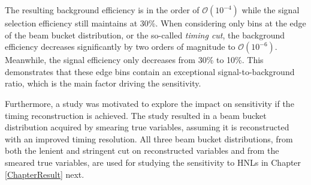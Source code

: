 The resulting background efficiency is in the order of $\mathcal{O}(10^{-4})$ while the signal selection efficiency still maintains at 30\%. 
When considering only bins at the edge of the beam bucket distribution, or the so-called \textit{timing cut}, the background efficiency decreases significantly by two orders of magnitude to $\mathcal{O}(10^{-6})$.
Meanwhile, the signal efficiency only decreases from 30\% to 10\%. 
This demonstrates that these edge bins contain an exceptional signal-to-background ratio, which is the main factor driving the sensitivity.

Furthermore, a study was motivated to explore the impact on sensitivity if the timing reconstruction is achieved.
The study resulted in a beam bucket distribution acquired by smearing true variables, assuming it is reconstructed with an improved timing resolution.
All three beam bucket distributions, from both the lenient and stringent cut on reconstructed variables and from the smeared true variables, are used for studying the sensitivity to HNLs in Chapter \ref{ChapterResult} next. 


